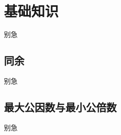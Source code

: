 
\section{基础知识}
\begin{frame}{别急}\end{frame} %
\subsection{同余}
\begin{frame}[c]
  \progressnow*
\end{frame}
\begin{frame}{别急}\end{frame} %
\subsection{最大公因数与最小公倍数}
\begin{frame}[c]
  \progressnow*
\end{frame}
\begin{frame}{别急}\end{frame} %
